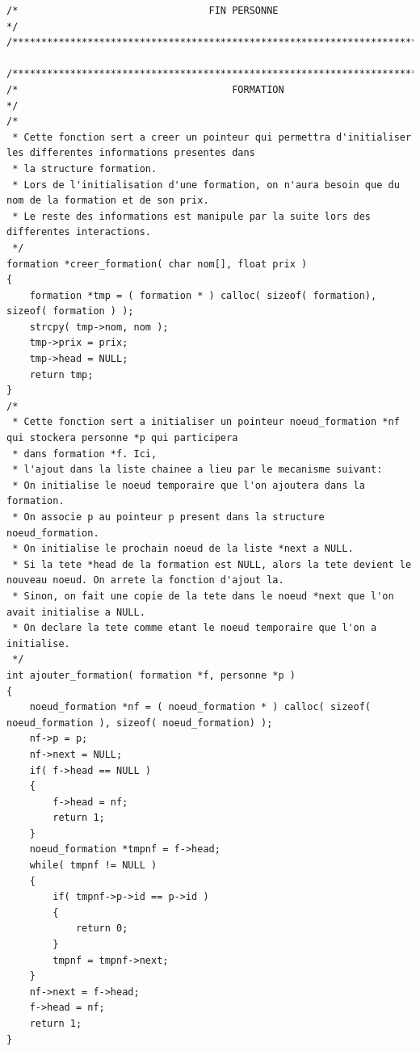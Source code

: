 \documentclass[11pt]{article}
\begin{document}
\begin{lstlisting}
/*                                 FIN PERSONNE                              */
/*****************************************************************************/

/*****************************************************************************/
/*                                     FORMATION                             */
/*
 * Cette fonction sert a creer un pointeur qui permettra d'initialiser les differentes informations presentes dans
 * la structure formation.
 * Lors de l'initialisation d'une formation, on n'aura besoin que du nom de la formation et de son prix.
 * Le reste des informations est manipule par la suite lors des differentes interactions.
 */
formation *creer_formation( char nom[], float prix )
{
    formation *tmp = ( formation * ) calloc( sizeof( formation), sizeof( formation ) );
    strcpy( tmp->nom, nom );
    tmp->prix = prix;
    tmp->head = NULL;
    return tmp;
}
/*
 * Cette fonction sert a initialiser un pointeur noeud_formation *nf qui stockera personne *p qui participera
 * dans formation *f. Ici,
 * l'ajout dans la liste chainee a lieu par le mecanisme suivant:
 * On initialise le noeud temporaire que l'on ajoutera dans la formation.
 * On associe p au pointeur p present dans la structure noeud_formation.
 * On initialise le prochain noeud de la liste *next a NULL.
 * Si la tete *head de la formation est NULL, alors la tete devient le nouveau noeud. On arrete la fonction d'ajout la.
 * Sinon, on fait une copie de la tete dans le noeud *next que l'on avait initialise a NULL.
 * On declare la tete comme etant le noeud temporaire que l'on a initialise.
 */
int ajouter_formation( formation *f, personne *p )
{
    noeud_formation *nf = ( noeud_formation * ) calloc( sizeof( noeud_formation ), sizeof( noeud_formation) );
    nf->p = p;
    nf->next = NULL;
    if( f->head == NULL )
    {
        f->head = nf;
        return 1;
    }
    noeud_formation *tmpnf = f->head;
    while( tmpnf != NULL )
    {
        if( tmpnf->p->id == p->id )
        {
            return 0;
        }
        tmpnf = tmpnf->next;
    }
    nf->next = f->head;
    f->head = nf;
    return 1;
}


\end{lstlisting}
\end{document}

